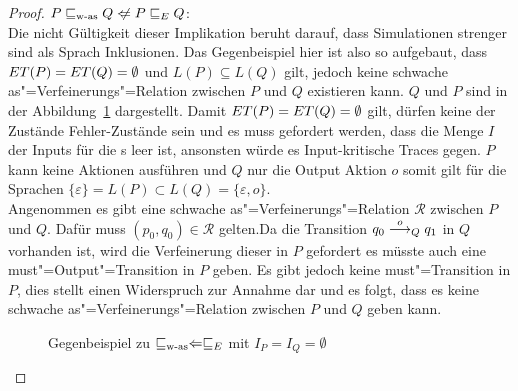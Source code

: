 \begin{proof}
  $P\wasRel Q\hspace{0.1cm}\not\hspace{-0.1cm}\Leftarrow P\ERel Q$:\\
  Die nicht Gültigkeit dieser Implikation beruht darauf, dass Simulationen
  strenger sind als Sprach Inklusionen. Das Gegenbeispiel hier ist also so
  aufgebaut, dass $ET (P) =ET (Q) = \emptyset$ und $L(P) \subseteq L(Q)$
  gilt, jedoch keine schwache as"=Verfeinerungs"=Relation zwischen $P$ und $Q$
  existieren kann. $Q$ und $P$ sind in der Abbildung~\ref{WasEGegenBsp}
  dargestellt. Damit $ET (P) =ET (Q) = \emptyset$ gilt, dürfen keine der
  Zustände Fehler-Zustände sein und es muss gefordert werden, dass die Menge
  $I$ der Inputs für die \MEIO{}s leer ist, ansonsten würde es Input-kritische
  Traces gegen. $P$ kann keine Aktionen ausführen und $Q$ nur die Output Aktion
  $o$ somit gilt für die Sprachen $\{\varepsilon\} = L(P) \subset L(Q) =
  \{\varepsilon , o\}$.\\
  Angenommen es gibt eine schwache as"=Verfeinerungs"=Relation $\mathcal{R}$
  zwischen $P$ und $Q$. Dafür muss $(p_0,q_0)\in \mathcal{R}$ gelten.Da die
  Transition $q_0 \must[o]_Q q_1$ in $Q$ vorhanden ist, wird die Verfeinerung
  dieser in $P$ gefordert es müsste auch eine must"=Output"=Transition in $P$
  geben. Es gibt jedoch keine must"=Transition in $P$, dies stellt einen
  Widerspruch zur Annahme dar und es folgt, dass es keine schwache
  as"=Verfeinerungs"=Relation zwischen $P$ und $Q$ geben kann.

  \begin{figure}[htbp]
    \begin{center}
      \caption{Gegenbeispiel zu $\sqsubseteq _{\mathrm{w}\text{-}\mathrm{as}} \Leftarrow  \sqsubseteq  _E$ mit $I_P = I_Q =
      \emptyset$}
      \label{WasEGegenBsp}
    \end{center}
  \end{figure}
\end{proof}

